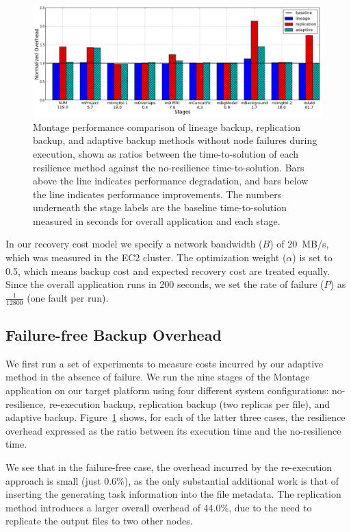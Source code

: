 \documentclass{sig-alternate}
\begin{document}
\begin{figure}[ht]
	\begin{center}
		\includegraphics[width=160mm]{pictures/no-failure.png}
		\vspace{-10pt}
		\caption{Montage performance comparison of lineage backup, replication backup, and adaptive backup
		methods without node failures during execution, shown as ratios between the time-to-solution 
		of each resilience method against the no-resilience time-to-solution. Bars above the line indicates performance degradation,
		and bars below the line indicates performance improvements. The numbers underneath the stage labels are the baseline time-to-solution measured in seconds for overall application and each stage.
		\label{fig:montage}}
  	\end{center}
\end{figure}

In our recovery cost model we specify a network bandwidth ($B$) of 20~MB/s, which was measured in the EC2 cluster. The optimization weight ($\alpha$) is set to 0.5, which means backup cost and expected recovery cost are treated equally. Since the overall application runs in 200 seconds, we set the rate of failure ($P$) as $\frac{1}{12800}$ (one fault per run).


\subsection{Failure-free Backup Overhead}
We first run a set of experiments to measure costs incurred by our adaptive method in the absence of failure.
We run the nine stages
of the Montage application on our target platform using four different system configurations: no-resilience, re-execution backup,
replication backup (two replicas per file), and adaptive backup.
Figure~\ref{fig:montage} shows, for each of the latter three cases, the resilience overhead expressed as
the ratio between its execution time and the no-resilience time.

We see that in the failure-free case, the overhead incurred by the re-execution approach is small (just 0.6\%),
as the only substantial additional work is that of inserting the generating task information into the file metadata.
The replication method introduces a larger overall overhead of 44.0\%, due to the need to replicate the output files
to two other nodes.
\end{document}
